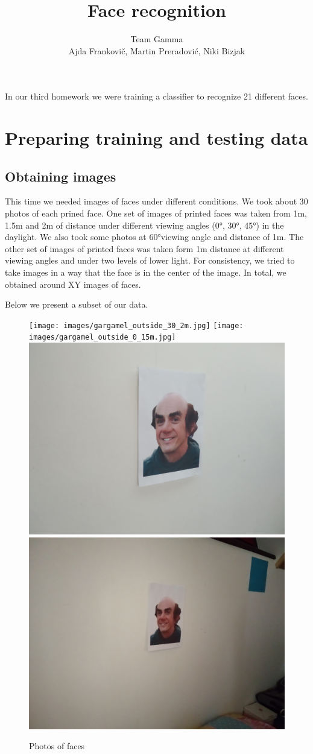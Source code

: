 \documentclass[12pt,a4paper]{article}
\author{Team Gamma \\ {\small Ajda Frankovič, Martin Preradović, Niki Bizjak}}
\title{Face recognition}
\date{}
\begin{document}
    \maketitle

    In our third homework we were training a classifier to recognize 21 different faces.

    \section{Preparing training and testing data}

    \subsection{Obtaining images}

    This time we needed images of faces under different conditions. We took about 30 photos of each prined face. %
    One set of images of printed faces was taken from 1m, 1.5m and 2m of distance under different viewing angles (0°, 30°, 45°) in the daylight. We also took some photos at 60°viewing angle and distance of 1m.
    The other set of images of printed faces was taken form 1m distance at different viewing angles and under two levels of lower light.
    For consistency, we tried to take images in a way that the face is in the center of the image.
    In total, we obtained around XY images of faces. %

    Below we present a subset of our data.

    \begin{figure}[H]
        \centering
        \texttt{[image: images/gargamel\_outside\_30\_2m.jpg]}
        \texttt{[image: images/gargamel\_outside\_0\_15m.jpg]}
        \includegraphics[width=.20\linewidth]{images/gargamel_inside_30_light.jpg}
        \includegraphics[width=.20\linewidth]{images/gargamel_inside_30_dark.jpg}
        \caption{Photos of faces}
    \end{figure}
\end{document}
